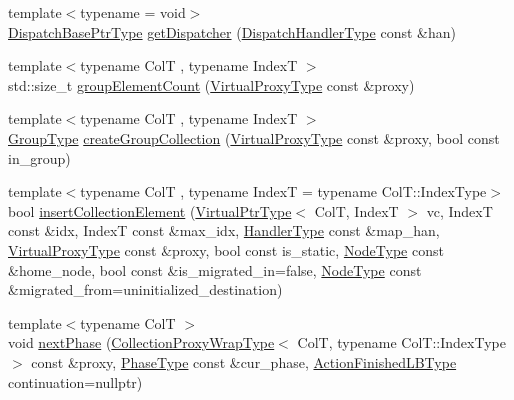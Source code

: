 \begin{DoxyCompactItemize}
\item 
{\footnotesize template$<$typename  = void$>$ }\\\hyperlink{namespacevt_1_1vrt_1_1collection_aa3b9731ae16d60fac43d68840f3606a5}{Dispatch\+Base\+Ptr\+Type} \hyperlink{structvt_1_1vrt_1_1collection_1_1_collection_manager_af183a018e0d2d8b3ed024244d8f83f45}{get\+Dispatcher} (\hyperlink{structvt_1_1vrt_1_1collection_1_1_collection_manager_a0cfe02a0426e95ec9daa2ef7374e07c7}{Dispatch\+Handler\+Type} const \&han)
\item 
{\footnotesize template$<$typename ColT , typename IndexT $>$ }\\std\+::size\+\_\+t \hyperlink{structvt_1_1vrt_1_1collection_1_1_collection_manager_a93b0cf22a65db97cd5816c01191b9d8d}{group\+Element\+Count} (\hyperlink{namespacevt_a1b417dd5d684f045bb58a0ede70045ac}{Virtual\+Proxy\+Type} const \&proxy)
\item 
{\footnotesize template$<$typename ColT , typename IndexT $>$ }\\\hyperlink{namespacevt_a27b5e4411c9b6140c49100e050e2f743}{Group\+Type} \hyperlink{structvt_1_1vrt_1_1collection_1_1_collection_manager_a05de48c4386d84532b19a96b0cefc172}{create\+Group\+Collection} (\hyperlink{namespacevt_a1b417dd5d684f045bb58a0ede70045ac}{Virtual\+Proxy\+Type} const \&proxy, bool const in\+\_\+group)
\item 
{\footnotesize template$<$typename ColT , typename IndexT  = typename Col\+T\+::\+Index\+Type$>$ }\\bool \hyperlink{structvt_1_1vrt_1_1collection_1_1_collection_manager_afc919bd549505ed40c3e1a41623d569a}{insert\+Collection\+Element} (\hyperlink{structvt_1_1vrt_1_1collection_1_1_collection_manager_a1da9015e52d6ecca955f57b59aab0b82}{Virtual\+Ptr\+Type}$<$ ColT, IndexT $>$ vc, IndexT const \&idx, IndexT const \&max\+\_\+idx, \hyperlink{namespacevt_af64846b57dfcaf104da3ef6967917573}{Handler\+Type} const \&map\+\_\+han, \hyperlink{namespacevt_a1b417dd5d684f045bb58a0ede70045ac}{Virtual\+Proxy\+Type} const \&proxy, bool const is\+\_\+static, \hyperlink{namespacevt_a866da9d0efc19c0a1ce79e9e492f47e2}{Node\+Type} const \&home\+\_\+node, bool const \&is\+\_\+migrated\+\_\+in=false, \hyperlink{namespacevt_a866da9d0efc19c0a1ce79e9e492f47e2}{Node\+Type} const \&migrated\+\_\+from=uninitialized\+\_\+destination)
\item 
{\footnotesize template$<$typename ColT $>$ }\\void \hyperlink{structvt_1_1vrt_1_1collection_1_1_collection_manager_aa9d5a1889d871bce9c49552847e50386}{next\+Phase} (\hyperlink{structvt_1_1vrt_1_1collection_1_1_collection_manager_a56458ed7f9bb22b631b9b3a745f42f94}{Collection\+Proxy\+Wrap\+Type}$<$ ColT, typename Col\+T\+::\+Index\+Type $>$ const \&proxy, \hyperlink{namespacevt_a46ce6733d5cdbd735d561b7b4029f6d7}{Phase\+Type} const \&cur\+\_\+phase, \hyperlink{structvt_1_1vrt_1_1collection_1_1_collection_manager_a2649daab7b437e1e2bdb5f2eefff29b6}{Action\+Finished\+L\+B\+Type} continuation=nullptr)

\end{DoxyCompactItemize}
